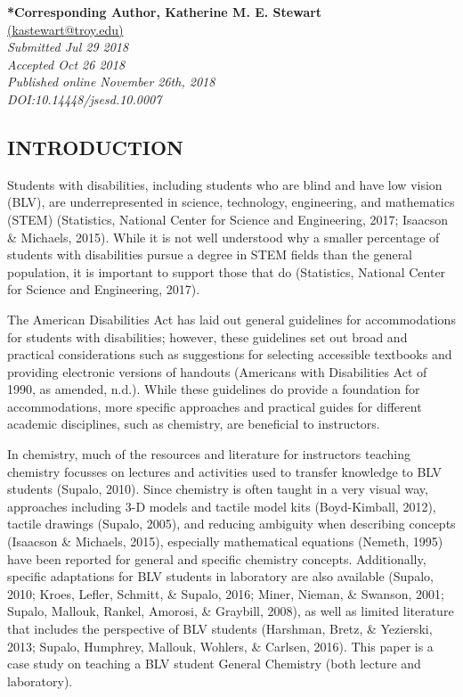 \documentclass[11.5pt]{sig-alternate} %
\begin{document}
\textbf{*Corresponding Author, Katherine M. E. Stewart}\\
\href{mailto:  kastewart@troy.edu}{(kastewart@troy.edu)} \\
\textit{Submitted  Jul 29 2018 }\\
\textit{Accepted Oct 26 2018 } \\
\textit{Published online November 26th, 2018} \\
\textit{DOI:10.14448/jsesd.10.0007} \\
\pagebreak
\clearpage
\begin{large}
\section*{INTRODUCTION}

Students with disabilities, including students who are blind and have low vision (BLV), are underrepresented in science, technology, engineering, and mathematics (STEM) (Statistics, National Center for Science and Engineering, 2017; Isaacson \& Michaels, 2015).  While it is not well understood why a smaller percentage of students with disabilities pursue a degree in STEM fields than the general population, it is important to support those that do (Statistics, National Center for Science and Engineering, 2017).
 
The American Disabilities Act has laid out general guidelines for accommodations for students with disabilities; however, these guidelines set out broad and practical considerations such as suggestions for selecting accessible textbooks and providing electronic versions of handouts (Americans with Disabilities Act of 1990, as amended, n.d.).  While these guidelines do provide a foundation for accommodations, more specific approaches and practical guides for different academic disciplines, such as chemistry, are beneficial to instructors.

In chemistry, much of the resources and literature for instructors teaching chemistry focusses on lectures and activities used to transfer knowledge to BLV students (Supalo, 2010).  Since chemistry is often taught in a very visual way, approaches including 3-D models and tactile model kits (Boyd-Kimball, 2012), tactile drawings (Supalo, 2005), and reducing ambiguity when describing concepts (Isaacson \& Michaels, 2015), especially mathematical equations (Nemeth, 1995) have been reported for general and specific chemistry concepts.  Additionally, specific adaptations for BLV students in laboratory are also available (Supalo, 2010; Kroes, Lefler, Schmitt, \& Supalo, 2016; Miner, Nieman, \& Swanson, 2001; Supalo, Mallouk, Rankel, Amorosi, \& Graybill, 2008), as well as limited literature that includes the perspective of BLV students (Harshman, Bretz, \& Yezierski, 2013; Supalo, Humphrey, Mallouk, Wohlers, \& Carlsen, 2016).   This paper is a case study on teaching a BLV student General Chemistry (both lecture and laboratory).   


\end{large}
\end{document}
